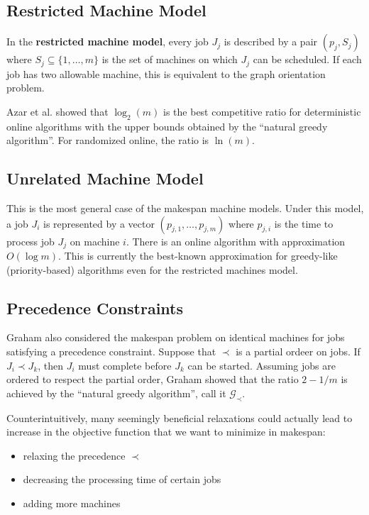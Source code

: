 \subsection{Restricted Machine Model}

In the \textbf{restricted machine model}, every job $J_j$ is described by a pair $(p_j, S_j)$ where $S_j \subseteq \{1,\ldots,m\}$ is the set of machines on which $J_j$ can be scheduled. If each job has two allowable machine, this is equivalent to the graph orientation problem.

Azar et al. showed that $\log_2 (m)$ is the best competitive ratio for deterministic online algorithms with the upper bounds obtained by the ``natural greedy algorithm''. For randomized online, the ratio is $\ln(m)$.

\subsection{Unrelated Machine Model}

This is the most general case of the makespan machine models. Under this model, a job $J_i$ is represented by a vector $(p_{j,1},\ldots,p_{j,m})$ where $p_{j,i}$ is the time to process job $J_j$ on machine $i$. There is an online algorithm with approximation $O(\log m)$. This is currently the best-known approximation for greedy-like (priority-based) algorithms even for the restricted machines model.

\subsection{Precedence Constraints}

Graham also considered the makespan problem on identical machines for jobs satisfying a precedence constraint. Suppose that $\prec$ is a partial ordeer on jobs. If $J_i \prec J_k$, then $J_i$ must complete before $J_k$ can be started. Assuming jobs are ordered to respect the partial order, Graham showed that the ratio $2-1/m$ is achieved by the ``natural greedy algorithm'', call it $\mathcal{G}_\prec$.

Counterintuitively, many seemingly beneficial relaxations could actually lead to increase in the objective function that we want to minimize in makespan:
\begin{itemize}
    \item relaxing the precedence $\prec$
    \item decreasing the processing time of certain jobs
    \item adding more machines
\end{itemize}

